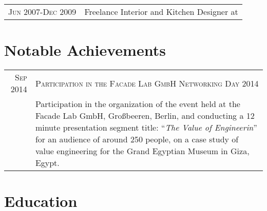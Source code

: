 \documentclass[a4paper,11pt]{article} %
\begin{document}
\begin{tabular}{r|p{11cm}}

\textsc{Jun 2007-Dec 2009} & Freelance Interior and Kitchen Designer at \emph{}\\
\end{tabular}

\vspace{0.5cm}

\section{Notable Achievements}

\begin{tabular}{r|p{11cm}}
\textsc{Sep 2014} & \textsc{Participation in the Facade Lab GmbH Networking Day 2014}\\ 
& \footnotesize{Participation in the organization of the event held at the Facade Lab GmbH, Gro\ss beeren, Berlin, and conducting a 12 minute presentation segment title: ``\emph{The Value of Engineerin}'' for an audience of around 250 people, on a case study of value engineering for the Grand Egyptian Museum in Giza, Egypt.}\\
\end{tabular}


\section{Education}
\end{document}
